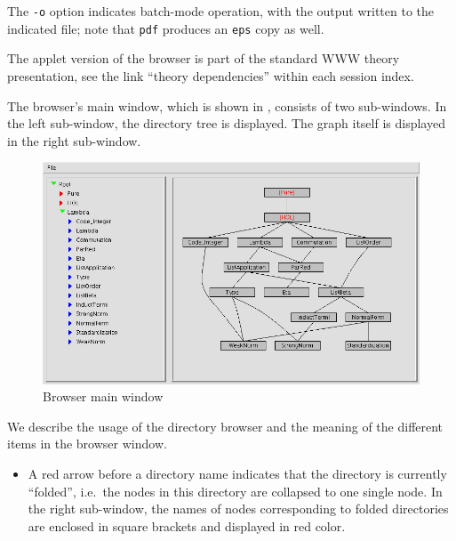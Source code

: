 \begin{isabellebody}
\begin{isamarkuptext}
  The \verb|-o| option indicates batch-mode operation, with the
  output written to the indicated file; note that \verb|pdf|
  produces an \verb|eps| copy as well.

  \medskip The applet version of the browser is part of the standard
  WWW theory presentation, see the link ``theory dependencies'' within
  each session index.%
\end{isamarkuptext}%
\isamarkuptrue%
%
\isamarkuptrue%
%
\begin{isamarkuptext}%
The browser's main window, which is shown in
  , consists of two sub-windows.  In the
  left sub-window, the directory tree is displayed. The graph itself
  is displayed in the right sub-window.

  \begin{figure}[ht]
  \includegraphics[width=\textwidth]{browser_screenshot}
  \caption{\label{fig:browserwindow} Browser main window}
  \end{figure}%
\end{isamarkuptext}%
\isamarkuptrue%
%
\isamarkuptrue%
%
\begin{isamarkuptext}%
We describe the usage of the directory browser and the meaning of
  the different items in the browser window.

  \begin{itemize}
  
  \item A red arrow before a directory name indicates that the
  directory is currently ``folded'', i.e.~the nodes in this directory
  are collapsed to one single node. In the right sub-window, the names
  of nodes corresponding to folded directories are enclosed in square
  brackets and displayed in red color.
  

\end{itemize}
\end{isamarkuptext}
\end{isabellebody}
